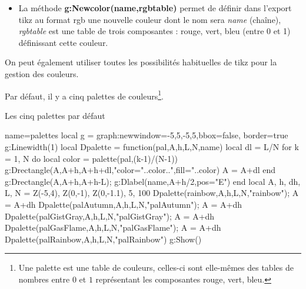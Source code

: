 \begin{itemize}
    \item La méthode \textbf{g:Newcolor(name,rgbtable)} permet de définir dans l'export tikz au format rgb une nouvelle couleur dont le nom sera \emph{name} (chaîne), \emph{rgbtable} est une table de trois composantes : rouge, vert, bleu (entre 0 et 1) définissant cette couleur.
    
\end{itemize}
On peut également utiliser toutes les possibilités habituelles de tikz pour la gestion des couleurs.

Par défaut, il y a cinq palettes de couleurs\footnote{Une palette est une table de couleurs, celles-ci sont elle-mêmes des tables de nombres entre $0$ et $1$ représentant les composantes rouge, vert, bleu.}.

\begin{demo}{Les cinq palettes par défaut}
\begin{luadraw}{name=palettes}
local g = graph:new{window={-5,5,-5,5},bbox=false, border=true}
g:Linewidth(1)
local Dpalette = function(pal,A,h,L,N,name)
    local dl = L/N
    for k = 1, N do
        local color = palette(pal,(k-1)/(N-1))
        g:Drectangle(A,A+h,A+h+dl,"color="..color..",fill="..color)
        A = A+dl
    end
    g:Drectangle(A,A+h,A+h-L); g:Dlabel(name,A+h/2,{pos="E"})
end
local A, h, dh, L, N = Z(-5,4), Z(0,-1), Z(0,-1.1), 5, 100
Dpalette(rainbow,A,h,L,N,"rainbow"); A = A+dh
Dpalette(palAutumn,A,h,L,N,"palAutumn"); A = A+dh
Dpalette(palGistGray,A,h,L,N,"palGistGray"); A = A+dh
Dpalette(palGasFlame,A,h,L,N,"palGasFlame"); A = A+dh
Dpalette(palRainbow,A,h,L,N,"palRainbow")
g:Show()
\end{luadraw}
\end{demo}

